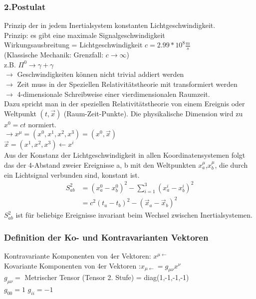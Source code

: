 \documentclass[a4paper]{article}
\begin{document}
\subsubsection{2.Postulat}
Prinzip der in jedem Inertialsystem konstanten Lichtgeschwindigkeit.\\
Prinzip: es gibt eine maximale Signalgeschwindigkeit\\
Wirkungsausbreitung = Lichtgeschwindigkeit $c=2.99*10^8\frac{m}{s}$\\
(Klassische Mechanik: Grenzfall: $c \rightarrow \infty$)\\
z.B. $\Pi^0 \rightarrow \gamma + \gamma$\\
$\rightarrow$ Geschwindigkeiten können nicht trivial addiert werden\\
$\rightarrow$ Zeit muss in der Speziellen Relativitätstheorie mit transformiert
werden\\
$\rightarrow$ 4-dimensionale Schreibweise einer vierdimensionalen Raumzeit.\\
Dazu spricht man in der speziellen Relativitätstheorie von einem Ereignis oder
Weltpunkt $(t,\vec{x})$ (Raum-Zeit-Punkte). Die physikalische Dimension wird zu
$x^0=ct$ normiert.\\
$\rightarrow x^{\mu}=(x^0,x^1,x^2,x^3)=(x^0,\vec{x})$\\
$\vec{x}=(x^1,x^2,x^3)\leftarrow x^i$\\
Aus der Konstanz der Lichtgeschwindigkeit in allen Koordinatensystemen folgt
das der 4-Abstand zweier Ereignisse a, b mit den Weltpunkten
$x^{\mu}_a$,$x^{\mu}_b$, die durch ein Lichtsignal verbunden sind, konstant
ist.
\begin{align}
S^2_{ab}&=(x^0_a-x^0_b)^2-\sum_{i=1}^3(x^i_a-x^i_b)^2 \\
&=c^2(t_a-t_b)^2-(\vec{x}_a-\vec{x}_b)^2
\end{align}
$S^2_{ab}$ ist für beliebige Ereignisse invariant beim Wechsel zwischen
Inertialsystemen.
\subsubsection{Definition der Ko- und Kontravarianten Vektoren}
Kontravariante Komponenten von 4er Vektoren: $x^{\mu \leftarrow}$\\ 
Kovariante Komponenten von 4er Vektoren :$x_{\mu \leftarrow}=g_{\mu
\nu}x^{\nu}$\\
$g_{\mu \nu} =$ Metrischer Tensor (Tensor 2. Stufe)
	     = diag(1,-1,-1,-1)\\
		  $g_{00}=1$ $g_{ii}=-1$\\
\end{document}
